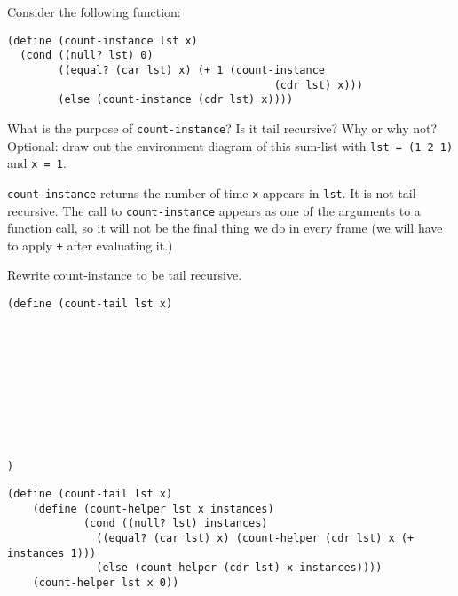 \begin{blocksection}
\question Consider the following function:

\begin{lstlisting}
(define (count-instance lst x)
  (cond ((null? lst) 0)
        ((equal? (car lst) x) (+ 1 (count-instance 
                                          (cdr lst) x)))
        (else (count-instance (cdr lst) x))))
\end{lstlisting}

\vspace{2\baselineskip}

What is the purpose of \texttt{count-instance}? Is it tail recursive? Why or why not?
\newline
Optional: draw out the environment diagram of this sum-list with \texttt{lst = (1 2 1)} and \texttt{x = 1}.

\begin{solution}[0.5in]
\texttt{count-instance} returns the number of time \texttt{x} appears in \texttt{lst}. It is not tail recursive. The call to \texttt{count-instance} appears as one of the arguments to a function call, so it will not be the final thing we do in every frame (we will have to apply \texttt{+} after evaluating it.)
\end{solution}
\end{blocksection}

\newpage

\begin{blocksection}
\question Rewrite count-instance to be tail recursive.

\begin{lstlisting}
(define (count-tail lst x)










)
\end{lstlisting}

\begin{solution}[0.5in]
\begin{lstlisting}
(define (count-tail lst x)
    (define (count-helper lst x instances)
		    (cond ((null? lst) instances)
              ((equal? (car lst) x) (count-helper (cdr lst) x (+ instances 1)))
              (else (count-helper (cdr lst) x instances))))
    (count-helper lst x 0))
\end{lstlisting}
\end{solution}

\end{blocksection}
